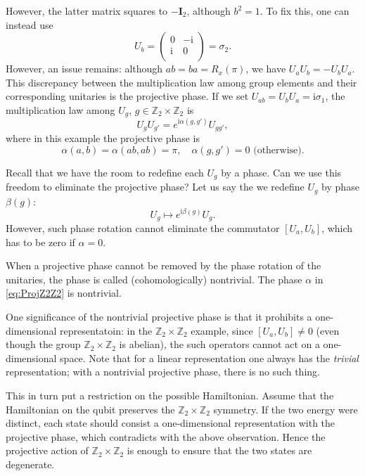 \documentclass[
]{scrartcl}
\numberwithin{equation}{section}
\theoremstyle{definition}
\theoremstyle{definition}
\theoremstyle{definition}
\theoremstyle{definition}
\theoremstyle{remark}
\begin{document}
However, the latter matrix squares to \(-\mathbf{I}_2\), although \(b^2=1\).
To fix this, one can instead use
\begin{equation}
  \label{eq:UbZ2Z2}
  U_b = 
  \begin{pmatrix}
    0 & -\mathrm{i} \\
    \mathrm{i} & 0 \\
  \end{pmatrix} =\sigma_2.
\end{equation}
However, an issue remains: although \(ab = ba = R_x(\pi)\), we have \(U_a U_b = - U_b U_a\).
This discrepancy between the multiplication law among group elements and their corresponding unitaries is the projective phase.
If we set \(U_{ab} = U_b U_a = \mathrm{i}\sigma _1\), the multiplication law among \(U_g\), \(g\in \mathbb{Z}_2\times\mathbb{Z}_2\) is
\begin{equation}
  \label{eq:ProjRep}
  U_g U_{g'} = e^{\mathrm{i}\alpha(g,g')}U_{gg'},
\end{equation}
where in this example the projective phase is
\begin{equation}
  \label{eq:ProjZ2Z2}
    \alpha(a,b) = \alpha(ab,ab) = \pi,\quad
    \alpha(g,g') = 0 \,\, \text{(otherwise)}.
\end{equation}

Recall that we have the room to redefine each \(U_g\) by a phase. Can we use this freedom to eliminate the projective phase?
Let us say the we redefine \(U_g\) by phase \(\beta(g)\):
\begin{equation}
  \label{eq:Uredef}
  U_g \mapsto e^{\mathrm{i}\beta(g)}U_g.
\end{equation}
However, such phase rotation cannot eliminate the commutator \([U_a,U_b]\), which has to be zero if \(\alpha = 0\).

When a projective phase cannot be removed by the phase rotation of the unitaries, the phase is called (cohomologically) nontrivial. The phase \(\alpha\) in \eqref{eq:ProjZ2Z2} is nontrivial.

One significance of the nontrivial projective phase is that it prohibits a one-dimensional representatoin: in the \(\mathbb{Z}_2\times\mathbb{Z}_2\) example, since \([U_a,U_b]\neq 0\) (even though the group \(\mathbb{Z}_2\times \mathbb{Z}_2\) is abelian), the such operators cannot act on a one-dimensional space. Note that for a linear representation one always has the \emph{trivial} representation; with a nontrivial projective phase, there is no such thing.

This in turn put a restriction on the possible Hamiltonian.
Assume that the Hamiltonian on the qubit preserves the \(\mathbb{Z}_2\times \mathbb{Z}_2\) symmetry.
If the two energy were distinct, each state should consist a one-dimensional representation with the projective phase, which contradicts with the above observation. Hence the projective action of \(\mathbb{Z}_2\times \mathbb{Z}_2\) is enough to ensure that the two states are degenerate.
\end{document}
